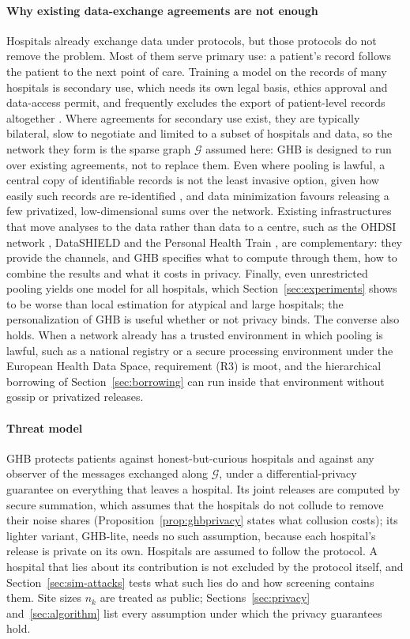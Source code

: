 \documentclass[acmsmall,screen,review]{acmart}
\theoremstyle{acmdefinition}
\begin{document}
\paragraph{Why existing data-exchange agreements are not enough} Hospitals already exchange data under protocols, but those protocols do not remove the problem. Most of them serve primary use: a patient's record follows the patient to the next point of care. Training a model on the records of many hospitals is secondary use, which needs its own legal basis, ethics approval and data-access permit, and frequently excludes the export of patient-level records altogether \cite{gdpr2016,ehds2025}. Where agreements for secondary use exist, they are typically bilateral, slow to negotiate and limited to a subset of hospitals and data, so the network they form is the sparse graph $\mathcal{G}$ assumed here: GHB is designed to run over existing agreements, not to replace them. Even where pooling is lawful, a central copy of identifiable records is not the least invasive option, given how easily such records are re-identified \cite{rocher2019estimating}, and data minimization favours releasing a few privatized, low-dimensional sums over the network. Existing infrastructures that move analyses to the data rather than data to a centre, such as the OHDSI network \cite{hripcsak2015observational}, DataSHIELD \cite{gaye2014datashield} and the Personal Health Train \cite{beyan2020distributed,deist2020distributed}, are complementary: they provide the channels, and GHB specifies what to compute through them, how to combine the results and what it costs in privacy. Finally, even unrestricted pooling yields one model for all hospitals, which Section~\ref{sec:experiments} shows to be worse than local estimation for atypical and large hospitals; the personalization of GHB is useful whether or not privacy binds. The converse also holds. When a network already has a trusted environment in which pooling is lawful, such as a national registry or a secure processing environment under the European Health Data Space, requirement (R3) is moot, and the hierarchical borrowing of Section~\ref{sec:borrowing} can run inside that environment without gossip or privatized releases.

\paragraph{Threat model} GHB protects patients against honest-but-curious hospitals and against any observer of the messages exchanged along $\mathcal{G}$, under a differential-privacy guarantee on everything that leaves a hospital. Its joint releases are computed by secure summation, which assumes that the hospitals do not collude to remove their noise shares (Proposition~\ref{prop:ghbprivacy} states what collusion costs); its lighter variant, GHB-lite, needs no such assumption, because each hospital's release is private on its own. Hospitals are assumed to follow the protocol. A hospital that lies about its contribution is not excluded by the protocol itself, and Section~\ref{sec:sim-attacks} tests what such lies do and how screening contains them. Site sizes $n_k$ are treated as public; Sections~\ref{sec:privacy} and~\ref{sec:algorithm} list every assumption under which the privacy guarantees hold.
\end{document}
